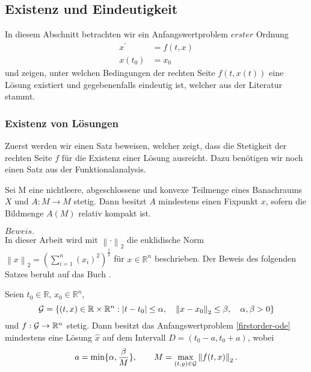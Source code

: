\subsection{Existenz und Eindeutigkeit}
In diesem Abschnitt betrachten wir ein Anfangswertproblem $erster$ Ordnung
\begin{align}
    x^{\prime}&=f(t,x) \nonumber \\
    x(t_{0})&=x_{0} \label{firstorder-ode}
\end{align}
und zeigen, unter welchen Bedingungen der rechten Seite $f(t,x(t))$ eine Lösung existiert und gegebenenfalls eindeutig
ist, welcher aus der Literatur \cite[13, 14]{sundermeierFixpunktsatzSchauder} stammt.

\subsubsection{Existenz von Lösungen}
Zuerst werden wir einen Satz beweisen, welcher zeigt, dass die Stetigkeit der rechten Seite $f$ für die Existenz einer
Lösung ausreicht. Dazu benötigen wir noch einen Satz aus der Funktionalanalysis.
\begin{satz}
    \label{fixpunktsatzvonschauder}
    Sei M eine nichtleere, abgeschlossene und konvexe Teilmenge eines Banachraums $X$ und $A:M \rightarrow M$ stetig.
    Dann besitzt $A$ mindestens einen Fixpunkt $x$, sofern die Bildmenge $A(M)$ relativ kompakt ist.
\end{satz}
$Beweis.$ \cite[13,14]{sundermeierFixpunktsatzSchauder}\\
In dieser Arbeit wird mit $\left\lVert \cdot \right\rVert_2$ die euklidische Norm
$\left\lVert x \right\rVert_2 = \left( \sum_{i=1}^{n} (x_i)^2  \right)^{\frac{1}{2}}$ für $x \in \mathbb{R}^n$
beschrieben. Der Beweis des folgenden Satzes beruht auf das Buch \cite{harroheuserGewohnlicheDifferentialgleichungen}.
\begin{satz}
\label{peano}
    Seien $t_0 \in \mathbb{R}$, $x_0 \in \mathbb{R}^n$,
    \[
        {\cal G}=\{(t,x) \in \mathbb{R} \times \mathbb{R}^{n}: |t-t_{0}| \leq \alpha, \quad
        \left\lVert x-x_{0} \right\rVert_2 \leq\beta, \quad \alpha,\beta > 0 \}
    \]
    und $f:{\cal G} \rightarrow \mathbb{R}^{n}$ stetig. Dann besitzt das Anfangswertproblem \eqref{firstorder-ode}
    mindestens eine Lösung $\hat{x}$ auf dem Intervall $D=(t_{0}-a,t_{0}+a)$, wobei
    \[
        a=\min\{\alpha, \frac{\beta}{M}\}, \qquad M= \max_{(t,y)\in {\cal G}}\left\lVert f(t,x)\right\rVert_2.
    \]
\end{satz}
